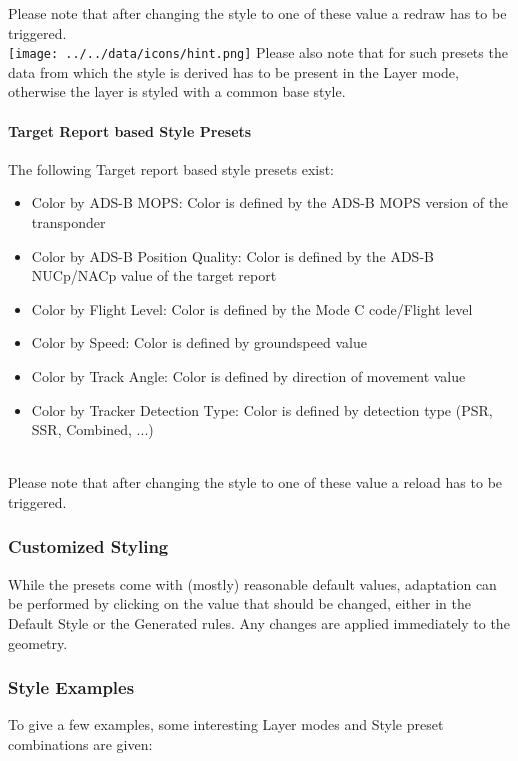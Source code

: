 Please note that after changing the style to one of these value a redraw has to be triggered. \\

\texttt{[image: ../../data/icons/hint.png]} Please also note that for such presets the data from which the style is derived has to be present in the Layer mode, otherwise the layer is styled with a common base style.

\paragraph{Target Report based Style Presets}
The following Target report based style presets exist:
\begin{itemize}
 \item Color by ADS-B MOPS: Color is defined by the ADS-B MOPS version of the transponder
 \item Color by ADS-B Position Quality: Color is defined by the ADS-B NUCp/NACp value of the target report
 \item Color by Flight Level: Color is defined by the Mode C code/Flight level
 \item Color by Speed: Color is defined by groundspeed value
 \item Color by Track Angle: Color is defined by direction of movement value
 \item Color by Tracker Detection Type: Color is defined by detection type (PSR, SSR, Combined, ...)
\end{itemize}
\  \\

Please note that after changing the style to one of these value a reload has to be triggered. \\

\subsubsection{Customized Styling}

While the presets come with (mostly) reasonable default values, adaptation can be performed by clicking on the value that should be changed, either in the Default Style or the Generated rules. Any changes are applied immediately to the geometry.

\subsubsection{Style Examples}

To give a few examples, some interesting Layer modes and Style preset combinations are given:

